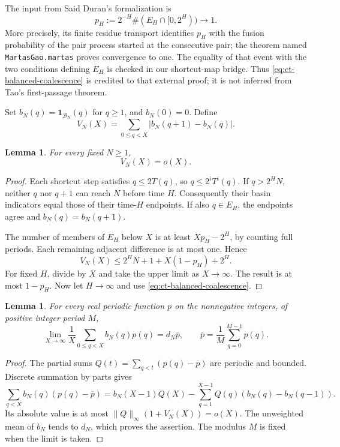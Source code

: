\documentclass[11pt,a4paper]{article}
\newtheorem{lemma}[theorem]{Lemma}
\begin{document}
The input from Said Duran's formalization is
\begin{equation}\label{eq:ct-balanced-coalescence}
 p_H:=2^{-H}\#(E_H\cap[0,2^H))\longrightarrow1.
\end{equation}
More precisely, its finite residue transport identifies \(p_H\) with
the fusion probability of the pair process started at the consecutive
pair; the theorem named \texttt{MartasGao.martas} proves convergence
to one. The equality of that event with the two conditions defining
\(E_H\) is checked in our shortcut-map bridge. Thus
\eqref{eq:ct-balanced-coalescence} is credited to that external proof;
it is not inferred from Tao's first-passage theorem.

Set \(b_N(q)=\mathbf1_{\mathcal B_N}(q)\) for \(q\ge1\), and
\(b_N(0)=0\). Define
\[
 V_N(X)=\sum_{0\le q<X}|b_N(q+1)-b_N(q)|.
\]

\begin{lemma}\label{lem:ct-basin-adjacent-variation}
For every fixed \(N\ge1\),
\begin{equation}\label{eq:ct-adjacent-variation}
 V_N(X)=o(X).
\end{equation}
\end{lemma}
\begin{proof}
Each shortcut step satisfies \(q\le2T(q)\), so
\(q\le2^iT^i(q)\). If \(q>2^HN\), neither \(q\) nor \(q+1\)
can reach \(N\) before time \(H\). Consequently their basin indicators
equal those of their time-\(H\) endpoints. If also \(q\in E_H\),
the endpoints agree and \(b_N(q)=b_N(q+1)\).

The number of members of \(E_H\) below \(X\) is at least
\(Xp_H-2^H\), by counting full periods. Each remaining adjacent
difference is at most one. Hence
\[
 V_N(X)\le 2^HN+1+X(1-p_H)+2^H.
\]
For fixed \(H\), divide by \(X\) and take the upper limit as
\(X\to\infty\). The result is at most \(1-p_H\). Now let
\(H\to\infty\) and use \eqref{eq:ct-balanced-coalescence}.
\end{proof}

\begin{lemma}\label{lem:ct-periodic-basin-mean}
For every real periodic function \(p\) on the nonnegative integers,
of positive integer period \(M\),
\begin{equation}\label{eq:ct-periodic-basin-mean}
 \lim_{X\to\infty}\frac1X\sum_{0\le q<X}b_N(q)p(q)
       =d_N\overline p,
 \qquad
 \overline p=\frac1M\sum_{q=0}^{M-1}p(q).
\end{equation}
\end{lemma}
\begin{proof}
The partial sums \(Q(t)=\sum_{q<t}(p(q)-\overline p)\) are
periodic and bounded. Discrete summation by parts gives
\[
 \sum_{q<X}b_N(q)(p(q)-\overline p)
 =b_N(X-1)Q(X)
   -\sum_{q=1}^{X-1}Q(q)(b_N(q)-b_N(q-1)).
\]
Its absolute value is at most \(\|Q\|_\infty(1+V_N(X))=o(X)\).
The unweighted mean of \(b_N\) tends to \(d_N\), which proves
the assertion. The modulus \(M\) is fixed when the limit is taken.
\end{proof}
\end{document}
